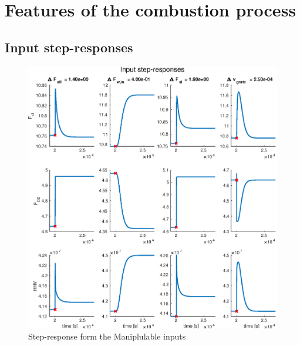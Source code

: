 \chapter{Features of the combustion process}
\label{cha:characteristics_of_process}


\section{Input step-responses}
\begin{figure}[!ht]
    \includegraphics[width=\textwidth]{img/Simple_analysis_plots/Unscaled_input_step_responses.eps}
    \caption{Step-response form the Maniplulable inputs}
    \label{fig:Input_step_response}
\end{figure}

